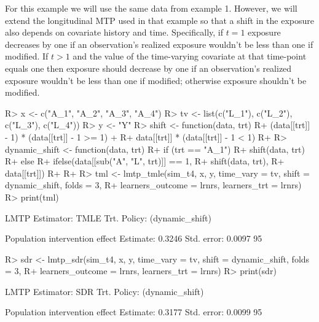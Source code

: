 \documentclass[]{jss}
\begin{document}
For this example we will use the same data from example 1. However, we will extend the longitudinal MTP used in that example so that a shift in the exposure also depends on covariate history and time. Specifically, if $t = 1$ exposure decreases by one if an observation's realized exposure wouldn’t be less than one if modified. If $t > 1$ and the value of the time-varying covariate at that time-point equals one then exposure should decrease by one if an observation's realized exposure wouldn’t be less than one if modified; otherwise exposure shouldn't be modified.

\begin{CodeChunk}

\begin{CodeInput}
R> x <- c("A_1", "A_2", "A_3", "A_4")
R> tv <- list(c("L_1"), c("L_2"), c("L_3"), c("L_4"))
R> y <- "Y"
R> shift <- function(data, trt) {
R+   (data[[trt]] - 1) * (data[[trt]] - 1 >= 1) + 
R+     data[[trt]] * (data[[trt]] - 1 < 1)
R+ }
R> dynamic_shift <- function(data, trt) {
R+   if (trt == "A_1") {
R+     shift(data, trt)
R+   } else {
R+     ifelse(data[[sub("A", "L", trt)]] == 1, 
R+            shift(data, trt),
R+            data[[trt]])
R+   }
R+ }
R> tml <- lmtp_tmle(sim_t4, x, y, time_vary = tv, shift = dynamic_shift, folds = 3, 
R+                   learners_outcome = lrnrs, learners_trt = lrnrs)
R> print(tml)
\end{CodeInput}

\begin{CodeOutput}
LMTP Estimator: TMLE
   Trt. Policy: (dynamic_shift)

Population intervention effect
      Estimate: 0.3246
    Std. error: 0.0097
        95%
\end{CodeOutput}

\begin{CodeInput}
R> sdr <- lmtp_sdr(sim_t4, x, y, time_vary = tv, shift = dynamic_shift, folds = 3, 
R+                 learners_outcome = lrnrs, learners_trt = lrnrs)
R> print(sdr)
\end{CodeInput}

\begin{CodeOutput}
LMTP Estimator: SDR
   Trt. Policy: (dynamic_shift)

Population intervention effect
      Estimate: 0.3177
    Std. error: 0.0099
        95%
\end{CodeOutput}

\end{CodeChunk}
\end{document}
